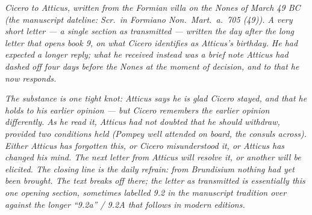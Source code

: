 
\textit{Cicero to Atticus, written from the Formian villa
on the Nones of March 49 BC (the manuscript dateline:
\textit{Scr.\ in Formiano Non.\ Mart.\ a.\ 705 (49)}). A
very short letter --- a single section as transmitted ---
written the day after the long letter that opens book 9,
on what Cicero identifies as Atticus's birthday. He had
expected a longer reply; what he received instead was a
brief note Atticus had dashed off four days before the
Nones \textit{at the moment of decision}, and to that he
now responds.}

\textit{The substance is one tight knot: Atticus says he
is glad Cicero stayed, and that he holds to his earlier
opinion --- but Cicero remembers the earlier opinion
differently. As he read it, Atticus had not doubted that
he should withdraw, provided two conditions held (Pompey
well attended on board, the consuls across). Either
Atticus has forgotten this, or Cicero misunderstood it,
or Atticus has changed his mind. The next letter from
Atticus will resolve it, or another will be elicited.
The closing line is the daily refrain: from Brundisium
nothing had yet been brought. The text breaks off there;
the letter as transmitted is essentially this one
opening section, sometimes labelled 9.2 in the
manuscript tradition over against the longer ``9.2a'' /
9.2A that follows in modern editions.}

